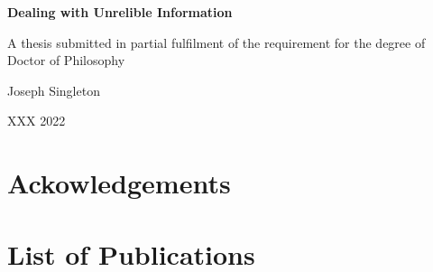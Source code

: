 \documentclass[a4paper,11pt,oneside]{memoir}
\begin{document}
\begin{titlingpage}

    \begin{center}
        {\HUGE\bfseries Dealing with Unrelible Information}
        \par
        \vspace{2cm}
        {\Large A thesis submitted in partial fulfilment of the requirement for the
        degree of Doctor of Philosophy}
        \par
        \vspace{2cm}
        {\LARGE Joseph Singleton}
        \par
        \vspace{10cm}
        {\Large XXX 2022}
    \end{center}

    \clearpage

    \begin{abstract}
        
    \end{abstract}

\end{titlingpage}

\frontmatter
\tableofcontents

\clearpage

\chapter*{Ackowledgements}


\chapter*{List of Publications}


\mainmatter



\printbibliography

\appendix

\end{document}

